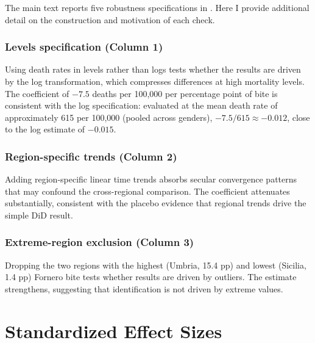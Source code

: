 \documentclass[12pt]{article}
\begin{document}
The main text reports five robustness specifications in . Here I provide additional detail on the construction and motivation of each check.

\subsubsection*{Levels specification (Column 1)} Using death rates in levels rather than logs tests whether the results are driven by the log transformation, which compresses differences at high mortality levels. The coefficient of $-7.5$ deaths per 100,000 per percentage point of bite is consistent with the log specification: evaluated at the mean death rate of approximately 615 per 100,000 (pooled across genders), $-7.5 / 615 \approx -0.012$, close to the log estimate of $-0.015$.

\subsubsection*{Region-specific trends (Column 2)} Adding region-specific linear time trends absorbs secular convergence patterns that may confound the cross-regional comparison. The coefficient attenuates substantially, consistent with the placebo evidence that regional trends drive the simple DiD result.

\subsubsection*{Extreme-region exclusion (Column 3)} Dropping the two regions with the highest (Umbria, 15.4 pp) and lowest (Sicilia, 1.4 pp) Fornero bite tests whether results are driven by outliers. The estimate strengthens, suggesting that identification is not driven by extreme values.

\section{Standardized Effect Sizes}
\label{sec:sde}


\end{document}
